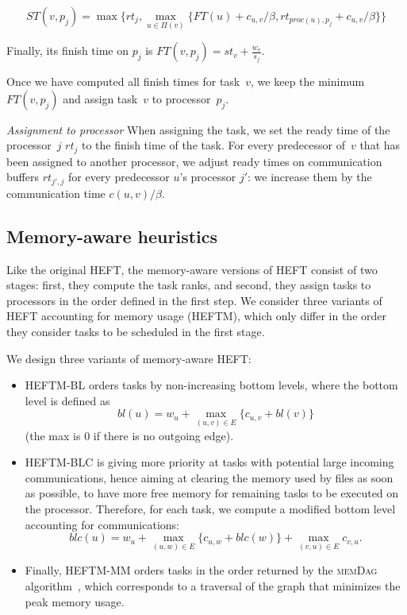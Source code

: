 \documentclass[conference]{IEEEtran}
\newcommand{\algo}[1]{\textsc{#1}}
\newcommand{\skug}[1]{{\color{blue}[SK: #1]}}
\begin{document}
 {\footnotesize{   \[ST(v, p_j) = \max{ \{rt_j, \max_{ u \in \Pi(v)}\{ FT(u)+ c_{u,v} / \beta , rt_{proc(u), p_j} + c_{u,v} / \beta  \} \} } \]}}

    Finally, its finish time on $p_j$ is
    $FT(v,p_j) = st_v + \frac{w_v}{s_j}$.

    Once we have computed all finish times for task~$v$,
    we keep the minimum $FT(v,p_j)$ and assign task~$v$
    to processor~$p_j$.

    \textit{Assignment to processor}
    When assigning the task, we set the ready time of the processor~$j$ $rt_j$ to the finish time of the task.
    For every predecessor of~$v$ that has been assigned to another processor, we adjust ready times on
    communication buffers $rt_{j', j}$ for every predecessor $u$'s processor $j'$: we increase them by the
    communication time $c( u,v) / \beta$.

    \subsection{Memory-aware heuristics}
    \label{sec.heftm}
    Like the original HEFT, the memory-aware versions of HEFT consist of two stages:
    first, they compute the task ranks,
    and second, they assign tasks to processors in the order defined in the first step.
    We consider three variants of HEFT accounting for memory usage (HEFTM), which only
    differ in the order they consider tasks to be scheduled in the first stage.

\smallskip

We design three variants of memory-aware HEFT:
\begin{itemize}
\item    HEFTM-BL orders tasks by non-increasing bottom levels, where the bottom
    level is defined as
    $$bl(u) = w_u + \max_{(u,v)\in E} \{c_{u,v} + bl(v)\}$$
    (the max is 0 if there is no outgoing edge).

\item    HEFTM-BLC %
    is  giving more priority at tasks with potential large incoming communications,
    hence aiming at clearing the memory used by files as soon as possible,
    to have more free memory for remaining tasks to be executed on the processor.
    Therefore, for each task, we compute a modified bottom level accounting for communications:
    $$blc(u) = w_u + \max_{(u,w)\in E} \{c_{u,w} + blc(w)\} + \max_{(v,u)\in E} c_{v,u}   . $$


\item   Finally, HEFTM-MM orders tasks  in the order returned by %
the  \algo{memDag} algorithm~\cite{KAYAASLAN20181}, which corresponds to a traversal
of the graph that minimizes the peak memory usage.

\end{itemize}
\end{document}
